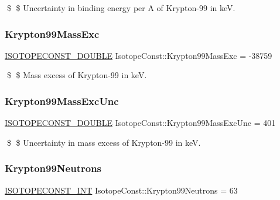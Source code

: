 \$ \$ Uncertainty in binding energy per A of Krypton-\/99 in keV. \mbox{\label{group___isotope_const-_krypton-_kr99_ga754dbbcac9c3c541906ab02b82414590}} 
\subsubsection{\texorpdfstring{Krypton99\+Mass\+Exc}{Krypton99MassExc}}
{\footnotesize\ttfamily \mbox{\hyperlink{group___isotope_const-_macros_ga8f45a7272ce02c0b4c65c44636ed719a}{I\+S\+O\+T\+O\+P\+E\+C\+O\+N\+S\+T\+\_\+\+D\+O\+U\+B\+LE}} Isotope\+Const\+::\+Krypton99\+Mass\+Exc = -\/38759}

\$ \$ Mass excess of Krypton-\/99 in keV. \mbox{\label{group___isotope_const-_krypton-_kr99_ga0c942a6cc72aab7497f398aecb7f5aaa}} 
\subsubsection{\texorpdfstring{Krypton99\+Mass\+Exc\+Unc}{Krypton99MassExcUnc}}
{\footnotesize\ttfamily \mbox{\hyperlink{group___isotope_const-_macros_ga8f45a7272ce02c0b4c65c44636ed719a}{I\+S\+O\+T\+O\+P\+E\+C\+O\+N\+S\+T\+\_\+\+D\+O\+U\+B\+LE}} Isotope\+Const\+::\+Krypton99\+Mass\+Exc\+Unc = 401}

\$ \$ Uncertainty in mass excess of Krypton-\/99 in keV. \mbox{\label{group___isotope_const-_krypton-_kr99_gaeff1bd48719092124245a75da09318d0}} 
\subsubsection{\texorpdfstring{Krypton99\+Neutrons}{Krypton99Neutrons}}
{\footnotesize\ttfamily \mbox{\hyperlink{group___isotope_const-_macros_ga5f18360b3e99483a35c32d789e62621c}{I\+S\+O\+T\+O\+P\+E\+C\+O\+N\+S\+T\+\_\+\+I\+NT}} Isotope\+Const\+::\+Krypton99\+Neutrons = 63}

